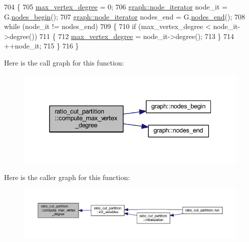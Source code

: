 \begin{DoxyCode}
704 \{
705     \mbox{\hyperlink{classratio__cut__partition_ab07041983ab24ac059e8c98192c146e4}{max\_vertex\_degree}} = 0;
706     \mbox{\hyperlink{classgraph_a2cb374b84c133ce13f94e73c3e5da7fa}{graph::node\_iterator}} node\_it = G.\mbox{\hyperlink{classgraph_aec053a4b509d1be804237a80044c54c0}{nodes\_begin}}();
707     \mbox{\hyperlink{classgraph_a2cb374b84c133ce13f94e73c3e5da7fa}{graph::node\_iterator}} nodes\_end = G.\mbox{\hyperlink{classgraph_abbf9c0cb5629e98e1142254911238173}{nodes\_end}}();
708     \textcolor{keywordflow}{while} (node\_it != nodes\_end)
709     \{
710     \textcolor{keywordflow}{if} (max\_vertex\_degree < node\_it->degree())
711     \{
712         \mbox{\hyperlink{classratio__cut__partition_ab07041983ab24ac059e8c98192c146e4}{max\_vertex\_degree}} = node\_it->degree();
713     \}
714     ++node\_it;
715     \}
716 \}
\end{DoxyCode}
Here is the call graph for this function\+:\nopagebreak
\begin{figure}[H]
\begin{center}
\leavevmode
\includegraphics[width=332pt]{classratio__cut__partition_af83d8fc26a0836f4852af5f1db1aff5b_cgraph}
\end{center}
\end{figure}
Here is the caller graph for this function\+:\nopagebreak
\begin{figure}[H]
\begin{center}
\leavevmode
\includegraphics[width=350pt]{classratio__cut__partition_af83d8fc26a0836f4852af5f1db1aff5b_icgraph}
\end{center}
\end{figure}
\mbox{\label{classratio__cut__partition_a39341e2459485a3f5367081ff208e769}} 

